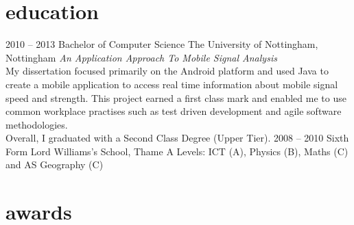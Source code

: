 \documentclass[]{friggeri-cv} %
\begin{document}

\section{education}

\begin{entrylist}
\entry
{2010 -- 2013}
{Bachelor {\normalfont of Computer Science}}
{The University of Nottingham, Nottingham}
{\emph{An Application Approach To Mobile Signal Analysis} \\ My dissertation focused primarily on the Android platform and used Java to create a mobile application to access real time information about mobile signal speed and strength. This project earned a first class mark and enabled me to use common workplace practises such as test driven development and agile software methodologies.\\Overall, I graduated with a Second Class Degree (Upper Tier).}
\entry
{2008 -- 2010}
{Sixth Form}
{Lord Williams's School, Thame}
{A Levels: ICT (A), Physics (B), Maths (C) and AS Geography (C)}
\end{entrylist}


\section{awards}
\end{document}
